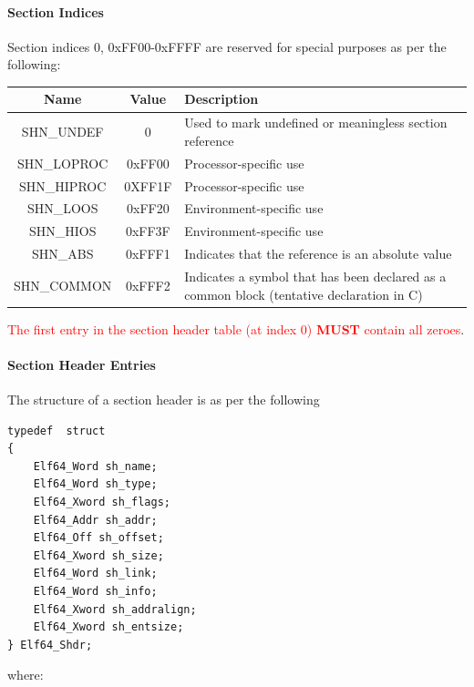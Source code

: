 \paragraph{Section Indices}
Section indices 0, 0xFF00-0xFFFF are reserved for special purposes as per the following: 
\begin{center}
    \begin{tabular}{|c|c|p{6cm}|} 
        \hline \textbf{Name} 	& \textbf{Value} 	& \textbf{Description}\\
        \hline SHN\_UNDEF & 0 & Used to mark undefined or meaningless section reference\\
        \hline SHN\_LOPROC & 0xFF00 & Processor-specific use\\
        \hline SHN\_HIPROC & 0XFF1F & Processor-specific use\\
        \hline SHN\_LOOS & 0xFF20 & Environment-specific use\\
        \hline SHN\_HIOS & 0xFF3F & Environment-specific use\\
        \hline SHN\_ABS & 0xFFF1 & Indicates that the reference is an absolute value\\
        \hline SHN\_COMMON & 0xFFF2 & Indicates a symbol that has been declared as a common block (tentative declaration in C)\\
        \hline
     \end{tabular}
 \end{center}
\textcolor{red}{The first entry in the section header table (at index 0) \textbf{MUST} contain all zeroes}. \paragraph{Section Header Entries} The structure of a section header is as per the following \begin{lstlisting}[style=ansic, caption={Section Header}, label=shdr]
typedef  struct
{
    Elf64_Word sh_name;
    Elf64_Word sh_type; 
    Elf64_Xword sh_flags; 
    Elf64_Addr sh_addr; 
    Elf64_Off sh_offset;
    Elf64_Xword sh_size;
    Elf64_Word sh_link;
    Elf64_Word sh_info;
    Elf64_Xword sh_addralign;
    Elf64_Xword sh_entsize;
} Elf64_Shdr;
\end{lstlisting} where:
